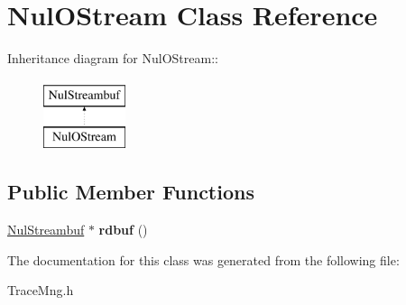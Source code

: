 \hypertarget{classNulOStream}{
\section{NulOStream Class Reference}
\label{classNulOStream}
}
Inheritance diagram for NulOStream::\begin{figure}[H]
\begin{center}
\leavevmode
\includegraphics[height=2cm]{classNulOStream}
\end{center}
\end{figure}
\subsection*{Public Member Functions}
\begin{DoxyCompactItemize}
\item 
\hypertarget{classNulOStream_adf32a85d4d53e7dfcb0e5d8ee259513b}{
\hyperlink{classNulStreambuf}{NulStreambuf} $\ast$ {\bfseries rdbuf} ()}
\label{classNulOStream_adf32a85d4d53e7dfcb0e5d8ee259513b}

\end{DoxyCompactItemize}


The documentation for this class was generated from the following file:\begin{DoxyCompactItemize}
\item 
TraceMng.h\end{DoxyCompactItemize}
